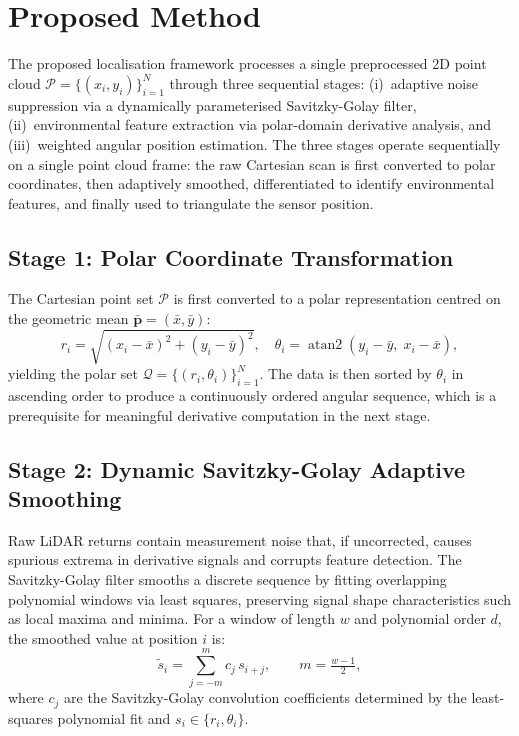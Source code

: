 \documentclass[lettersize,journal]{IEEEtran}
\begin{document}
\section{Proposed Method}\label{sec:method}

The proposed localisation framework processes a single preprocessed 2D point cloud
$\mathcal{P} = \{(x_i, y_i)\}_{i=1}^{N}$ through three sequential stages:
(i)~adaptive noise suppression via a dynamically parameterised Savitzky-Golay
filter, (ii)~environmental feature extraction via polar-domain derivative analysis,
and (iii)~weighted angular position estimation. The three stages operate
sequentially on a single point cloud frame: the raw Cartesian scan is first
converted to polar coordinates, then adaptively smoothed, differentiated to
identify environmental features, and finally used to triangulate the sensor
position.

\subsection{Stage 1: Polar Coordinate Transformation}

The Cartesian point set $\mathcal{P}$ is first converted to a polar representation
centred on the geometric mean $\bar{\mathbf{p}} = (\bar{x}, \bar{y})$:
\begin{equation}
  r_i = \sqrt{(x_i - \bar{x})^2 + (y_i - \bar{y})^2}, \quad
  \theta_i = \operatorname{atan2}(y_i - \bar{y},\; x_i - \bar{x}),
  \label{eq:polar}
\end{equation}
yielding the polar set $\mathcal{Q} = \{(r_i, \theta_i)\}_{i=1}^{N}$.
The data is then sorted by $\theta_i$ in ascending order to produce a
continuously ordered angular sequence, which is a prerequisite for
meaningful derivative computation in the next stage.

\subsection{Stage 2: Dynamic Savitzky-Golay Adaptive Smoothing}

Raw LiDAR returns contain measurement noise that, if uncorrected, causes spurious
extrema in derivative signals and corrupts feature detection. The Savitzky-Golay
filter \cite{savitzky1964smoothing} smooths a discrete sequence by fitting
overlapping polynomial windows via least squares, preserving signal shape
characteristics such as local maxima and minima. For a window of length $w$
and polynomial order $d$, the smoothed value at position $i$ is:
\begin{equation}
  \tilde{s}_i = \sum_{j=-m}^{m} c_j\, s_{i+j}, \qquad m = \tfrac{w-1}{2},
  \label{eq:savgol}
\end{equation}
where $c_j$ are the Savitzky-Golay convolution coefficients determined by the
least-squares polynomial fit and $s_i \in \{r_i, \theta_i\}$.
\end{document}
